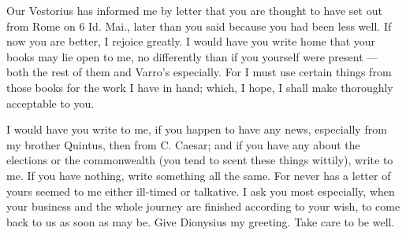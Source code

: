 

 Our Vestorius has informed me by letter that you are thought to have set out from Rome on 6 Id. Mai., later than you said because you had been less well. If now you are better, I rejoice greatly. I would have you write home that your books may lie open to me, no differently than if you yourself were present — both the rest of them and Varro's especially. For I must use certain things from those books for the work I have in hand; which, I hope, I shall make thoroughly acceptable to you.

 I would have you write to me, if you happen to have any news, especially from my brother Quintus, then from C. Caesar; and if you have any about the elections or the commonwealth (you tend to scent these things wittily), write to me. If you have nothing, write something all the same. For never has a letter of yours seemed to me either ill-timed or talkative. I ask you most especially, when your business and the whole journey are finished according to your wish, to come back to us as soon as may be. Give Dionysius my greeting. Take care to be well.
